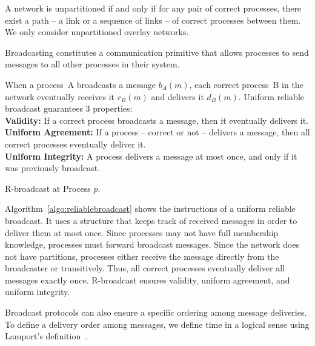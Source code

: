 
\begin{definition}
  A network is unpartitioned if and only if for any pair of correct processes,
  there exist a path -- a link or a sequence of links -- of correct processes
  between them. We only consider unpartitioned overlay networks.
\end{definition}

Broadcasting constitutes a communication primitive that allows processes to send
messages to all other processes in their system.

\begin{definition}
  When a process~A broadcasts a message $b_A(m)$, each correct process~B in the
  network eventually receives it $r_B(m)$ and delivers it $d_B(m)$.
  Uniform reliable broadcast guarantees 3 properties: \\
  \textbf{Validity:} If a correct process broadcasts a message, then it
  eventually delivers it. \\
  \textbf{Uniform Agreement:} If a process -- correct or not -- delivers a
  message, then all correct processes eventually deliver it. \\
  \textbf{Uniform Integrity:} A process delivers a message at most once, and
  only if it was previously broadcast.
\end{definition}

\begin{algorithm}[h]
  
  \caption{\label{algo:reliablebroadcast}R-broadcast at Process $p$.}
\end{algorithm}

Algorithm~\ref{algo:reliablebroadcast} shows the instructions of a uniform
reliable broadcast. It uses a structure that keeps track of received messages in
order to deliver them at most once.  Since processes may not have full
membership knowledge, processes must forward broadcast messages. Since the
network does not have partitions, processes either receive the message directly
from the broadcaster or transitively. Thus, all correct processes eventually
deliver all messages exactly once. R-broadcast ensures validity, uniform
agreement, and uniform integrity.

Broadcast protocols can also ensure a specific ordering among message
deliveries.  To define a delivery order among messages, we define time in a
logical sense using Lamport's definition~\cite{lamport1978time}.

